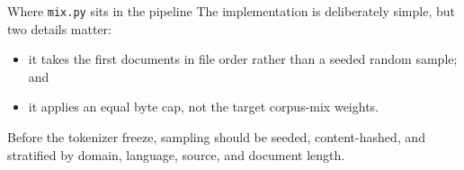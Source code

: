 \begin{paragraphblock}{Where \texttt{mix.py} sits in the pipeline}
  The implementation is deliberately simple, but two details matter:

  \begin{itemize}
      \setlength{\itemsep}{0pt}
    \item it takes the first documents in file order rather than a
      seeded random sample; and
    \item it applies an equal byte cap, not the target corpus-mix weights.
  \end{itemize}

  Before the tokenizer freeze, sampling should be seeded, content-hashed, and
  stratified by domain, language, source, and document length.
\end{paragraphblock}
